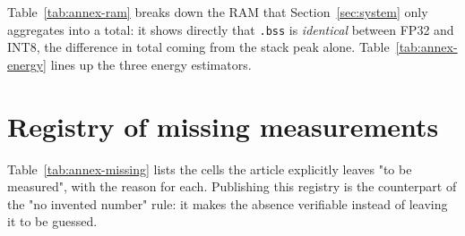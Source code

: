 \documentclass[11pt,a4paper]{article}
\begin{document}
Table~\ref{tab:annex-ram} breaks down the RAM that Section~\ref{sec:system} only
aggregates into a total: it shows directly that \texttt{.bss} is \emph{identical}
between FP32 and INT8, the difference in total coming from the stack peak alone.
Table~\ref{tab:annex-energy} lines up the three energy estimators.




\section{Registry of missing measurements}
\label{app:missing}

Table~\ref{tab:annex-missing} lists the cells the article explicitly leaves "to be
measured", with the reason for each. Publishing this registry is the counterpart of
the "no invented number" rule: it makes the absence verifiable instead of leaving it
to be guessed.



\printglossary[type=\acronymtype,title=Acronyms]
\label{sec:acronyms}
\end{document}
